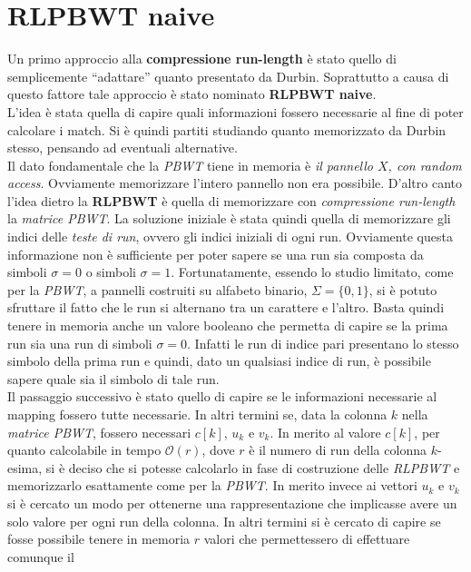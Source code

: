 \section{RLPBWT naive}
Un primo approccio alla \textbf{compressione run-length} è stato quello di
semplicemente ``adattare'' quanto presentato da Durbin. Soprattutto a causa di
questo fattore tale approccio è stato nominato \textbf{RLPBWT naive}.\\
L'idea è stata quella di capire quali informazioni fossero necessarie al fine di
poter calcolare i match. Si è quindi partiti studiando quanto memorizzato da
Durbin stesso, pensando ad eventuali alternative.\\
Il dato fondamentale che la \textit{PBWT} tiene in memoria è \textit{il pannello
  $X$, con random access}. Ovviamente memorizzare l'intero pannello non era
possibile. D'altro canto l'idea dietro la 
\textbf{RLPBWT} è quella di memorizzare con \textit{compressione run-length}
la \textit{matrice PBWT}. La soluzione iniziale è stata quindi quella di
memorizzare gli indici delle \textit{teste di run}, ovvero gli indici iniziali
di ogni run. Ovviamente questa informazione non è sufficiente per poter sapere
se una run sia composta da simboli $\sigma=0$ o simboli
$\sigma=1$. Fortunatamente, essendo lo studio limitato, come per la
\textit{PBWT}, a pannelli costruiti su alfabeto binario, $\Sigma=\{0,1\}$, si è
potuto sfruttare il fatto che le run si alternano tra un carattere e
l'altro. Basta quindi tenere in memoria anche un valore booleano che permetta di
capire se la prima run sia una run di simboli $\sigma=0$. Infatti le run di
indice pari presentano lo stesso simbolo della prima run e quindi, dato un
qualsiasi indice di run, è possibile sapere quale sia il simbolo di tale run.\\
Il passaggio successivo è stato quello di capire se le informazioni necessarie
al mapping fossero tutte necessarie. In altri termini se, data la colonna $k$
nella \textit{matrice PBWT}, fossero necessari $c[k]$, $u_k$ e $v_k$. In merito
al valore $c[k]$, per quanto calcolabile in tempo $\mathcal{O}(r)$, dove $r$ è
il numero di run della colonna $k$-esima, si è deciso che si potesse calcolarlo
in fase di costruzione delle \textit{RLPBWT} e memorizzarlo esattamente come per
la \textit{PBWT}. In merito invece ai vettori $u_k$ e $v_k$ si è cercato un modo
per ottenerne una rappresentazione che implicasse avere un solo valore per ogni
run della colonna. In altri termini si è cercato di capire se fosse possibile
tenere in memoria $r$ valori che permettessero di effettuare comunque il
